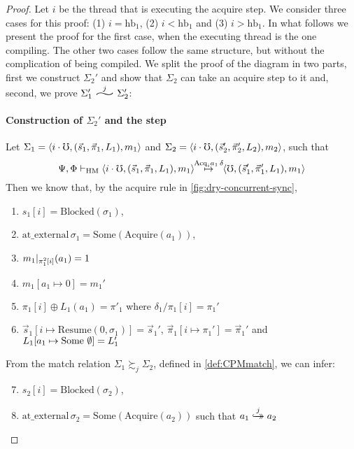\begin{proof} Let $i$ be the thread that is executing the acquire step. We consider three cases for this proof: (1) $i=\text{hb}_1$, (2) $i<\text{hb}_1$ and (3) $i>\text{hb}_1$. In what follows we present the proof for the first case, when the executing thread is the one compiling. The other two cases follow the same structure, but without the complication of being compiled. We split the proof of the diagram in two parts, first we construct $\Sigma_2'$ and show that $\Sigma_2$ can take an acquire step to it and, second, we prove  $\Sigma_1' \widesim{j} \Sigma_2'$:

\paragraph{Construction of $\Sigma_2'$ and the step} Let $\Sigma_1 = \left<i\cdot\mho, (\vec{s}_1, \vec{\pi}_1, L_1), m_1 \right>$ and $\Sigma_2 = \left<i\cdot\mho, (\vec{s}'_2, \vec{\pi}'_2, L_2), m_2 \right>$, 
such that
$$\Psi,\Phi \vdash_\mathrm{HM} 
\left<i\cdot\mho, (\vec{s}_1, \vec{\pi}_1, L_1), m_1 \right>
\!\!\stackrel{\mathrm{Acq}_i a_1\, \delta}\mapsto\!\!
\left<\mho, (\vec{s}'_1, \vec{\pi}'_1, L_1), m_1 \right>$$
Then we know that, by the acquire rule in \cref{fig:dry-concurrent-sync}, 
\begin{enumerate}
\item $s_1[i]\!=\!\mathrm{Blocked}(\sigma_1) $,
\item $\mathrm{at\_external}\,\sigma_1=\mathrm{Some}(\mathrm{Acquire}(a_1))$,
\item $m_1 |_{\pi_1^2[i]}(a_1)=1$
\item $m_1[a_1\mapsto 0]=m_1'$
\item $\pi_1[i] \oplus L_1(a_1) = \pi'_1$ where $\delta_1 / \pi_1[i] = \pi_1'$
\item 
  $\vec{s}_1[i\mapsto \mathrm{Resume}(0,\sigma_1)]=\vec{s}_1' $, 
  $\vec{\pi}_1[i\mapsto \pi_1']=\vec{\pi}_1'$ and
  $\lockpool_1[a_1\mapsto \mathrm{Some}\ \emptyset]=\lockpool_1'$
\end{enumerate}
\noindent From the match relation $\Sigma_1 \succsim_{j} \Sigma_2$, defined in \cref{def:CPMmatch}, we can infer:
\begin{enumerate}
\setcounter{enumi}{6}
\item $s_2[i]\!=\!\mathrm{Blocked}(\sigma_2)$,
\item $\mathrm{at\_external}\,\sigma_2=\mathrm{Some}(\mathrm{Acquire}(a_2))$ such that $a_1 \overset{j}{\hookrightarrow\mathrel{\mspace{-15mu}}\rightarrow} a_2$

\end{enumerate}
\end{proof}

